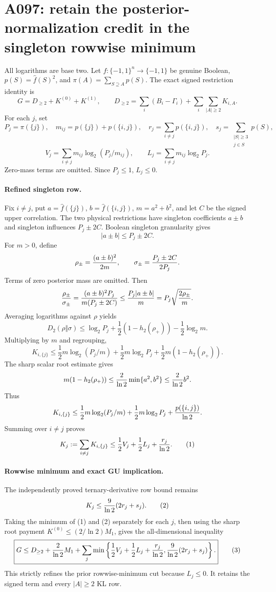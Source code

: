 \section*{A097: retain the posterior-normalization credit in the singleton rowwise minimum}

All logarithms are base two. Let \(f:\{-1,1\}^n\to\{-1,1\}\) be genuine Boolean, \(p(S)=\widehat f(S)^2\), and \(\pi(A)=\sum_{S\supseteq A}p(S)\). The exact signed restriction identity is
\[
G=D_{\ge2}+K^{(0)}+K^{(1)},\qquad
D_{\ge2}=\sum_i(B_i-\Gamma_i)+\sum_i\sum_{|A|\ge2}K_{i,A}.
\]
For each \(j\), set
\[
P_j=\pi(\{j\}),\quad m_{ij}=p(\{j\})+p(\{i,j\}),\quad
r_j=\sum_{i\ne j}p(\{i,j\}),\quad
s_j=\sum_{\substack{|S|\ge3\\j\in S}}p(S),
\]
\[
V_j=\sum_{i\ne j}m_{ij}\log_2(P_j/m_{ij}),\qquad
L_j=\sum_{i\ne j}m_{ij}\log_2P_j.
\]
Zero-mass terms are omitted. Since \(P_j\le1\), \(L_j\le0\).

\paragraph{Refined singleton row.}
Fix \(i\ne j\), put \(a=\widehat f(\{j\})\), \(b=\widehat f(\{i,j\})\), \(m=a^2+b^2\), and let \(C\) be the signed upper correlation. The two physical restrictions have singleton coefficients \(a\pm b\) and singleton influences \(P_j\pm2C\). Boolean singleton granularity gives
\[
|a\pm b|\le P_j\pm2C.
\]
For \(m>0\), define
\[
\rho_\pm={(a\pm b)^2\over2m},\qquad
\sigma_\pm={P_j\pm2C\over2P_j}.
\]
Terms of zero posterior mass are omitted. Then
\[
{\rho_\pm\over\sigma_\pm}
={(a\pm b)^2P_j\over m(P_j\pm2C)}
\le {P_j|a\pm b|\over m}
=P_j\sqrt{{2\rho_\pm\over m}}.
\]
Averaging logarithms against \(\rho\) yields
\[
D_2(\rho\Vert\sigma)
\le \log_2P_j+\frac12(1-h_2(\rho_+))-\frac12\log_2m.
\]
Multiplying by \(m\) and regrouping,
\[
K_{i,\{j\}}\le
\frac12m\log_2(P_j/m)+\frac12m\log_2P_j
+\frac12m(1-h_2(\rho_+)).
\]
The sharp scalar root estimate gives
\[
m(1-h_2(\rho_+))
\le {2\over\ln2}\min\{a^2,b^2\}
\le {2\over\ln2}b^2.
\]
Thus
\[
K_{i,\{j\}}\le
\frac12m\log_2(P_j/m)+\frac12m\log_2P_j
+{p(\{i,j\})\over\ln2}.
\]
Summing over \(i\ne j\) proves
\[
K_j:=\sum_{i\ne j}K_{i,\{j\}}
\le {1\over2}V_j+{1\over2}L_j+{r_j\over\ln2}.
\tag{1}
\]

\paragraph{Rowwise minimum and exact GU implication.}
The independently proved ternary-derivative row bound remains
\[
K_j\le {9\over\ln2}(2r_j+s_j).
\tag{2}
\]
Taking the minimum of (1) and (2) separately for each \(j\), then using the sharp root payment \(K^{(0)}\le(2/\ln2)M_1\), gives the all-dimensional inequality
\[
\boxed{G\le D_{\ge2}+{2\over\ln2}M_1+
\sum_j\min\left\{
{1\over2}V_j+{1\over2}L_j+{r_j\over\ln2},
{9\over\ln2}(2r_j+s_j)
\right\}.}
\tag{3}
\]
This strictly refines the prior rowwise-minimum cut because \(L_j\le0\). It retains the signed term and every \(|A|\ge2\) KL row.

